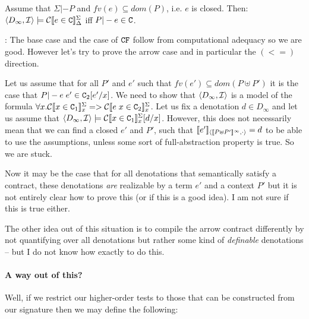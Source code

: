 \documentclass[preprint,nocopyrightspace]{sigplanconf}
\begin{document}
\begin{proposition} Assume that $\Sigma |- P$ and $fv(e) \subseteq dom(P)$, i.e. $e$ is closed.
Then: $\langle D_\infty,{\cal I}\rangle \models \ctrans{\Sigma}{\Delta}{e \in \Ct}$ iff $P |- e \in \Ct$.
\end{proposition}

{:}
The base case and the case of $\CF$ follow from computational adequacy so we are good. However
let's try to prove the arrow case and in particular the $(<=)$ direction. 

Let us assume that for all $P'$ and $e'$ such that $fv(e') \subseteq dom(P\uplus P')$ it is the case that
$P |- e\;e' \in \Ct_2[e'/x]$. We need to show that $\langle D_\infty,{\cal I}\rangle$ is a model of the 
formula $\forall x. \ctrans{\Sigma}{x}{x \in \Ct_1} => \ctrans{\Sigma}{x}{e\;x \in \Ct_2}$. Let us fix
a denotation $d \in D_{\infty}$ and let us assume 
that $\langle D_{\infty},{\cal I} \rangle \models \ctrans{\Sigma}{x}{x \in \Ct_1}[d/x]$. However, this does not 
necessarily mean that we can find a closed $e'$ and $P'$, such 
that $\interp{e'}{\dbrace{P{\uplus}P'}^\infty}{\cdot} = d$ to be able to use the assumptions, unless some sort
of full-abstraction property is true. So we are stuck.

Now it may be the case that for all denotations that semantically satisfy a contract, these denotations {\em are} 
realizable by a term $e'$ and a context $P'$ but it is not entirely clear how to prove this (or if this is a good
idea). I am not sure if this is true either.

The other idea out of this situation is to compile the arrow contract differently by not quantifying over all 
denotations but rather some kind of {\em definable} denotations -- but I do not know how exactly to do this.


\paragraph{A way out of this?}
Well, if we restrict our higher-order tests to those that can be constructed from our signature then 
we may define the following:
\end{document}
